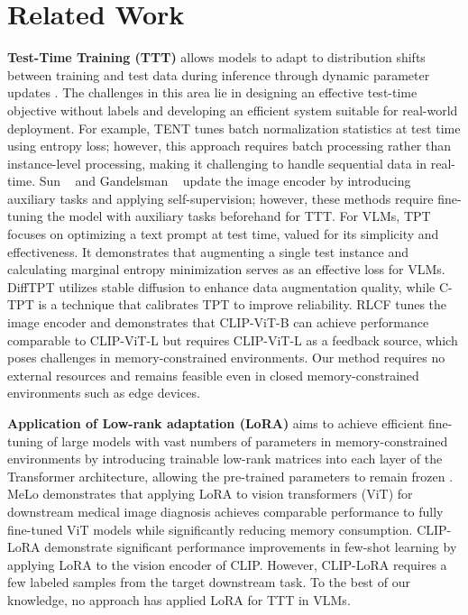 \section{Related Work}
\label{sec:related_works}

\noindent\textbf{Test-Time Training (TTT)} allows models to adapt to distribution shifts between training and test data during inference through dynamic parameter updates \citep{liang2024comprehensive,wang2024search,chen2022contrastive}.
The challenges in this area lie in designing an effective test-time objective without labels and developing an efficient system suitable for real-world deployment.
For example, TENT \citep{wang2020tent} tunes batch normalization statistics at test time using entropy loss; however, this approach requires batch processing rather than instance-level processing, making it challenging to handle sequential data in real-time.
Sun \etal~\cite{sun2020test} and Gandelsman \etal~\cite{gandelsman2022test} update the image encoder by introducing auxiliary tasks and applying self-supervision; however, these methods require fine-tuning the model with auxiliary tasks beforehand for TTT.
For VLMs, TPT \citep{shu2022test} focuses on optimizing a text prompt at test time, valued for its simplicity and effectiveness.
It demonstrates that augmenting a single test instance and calculating marginal entropy minimization \citep{zhang2022memo} serves as an effective loss for VLMs.
DiffTPT \citep{feng2023diverse} utilizes stable diffusion to enhance data augmentation quality, while C-TPT \citep{yoon2024c} is a technique that calibrates TPT to improve reliability.
RLCF \citep{zhao2023test} tunes the image encoder and demonstrates that CLIP-ViT-B can achieve performance comparable to CLIP-ViT-L but requires CLIP-ViT-L as a feedback source, which poses challenges in memory-constrained environments.
Our method requires no external resources and remains feasible even in closed memory-constrained environments such as edge devices.
\newline

\noindent\textbf{Application of Low-rank adaptation (LoRA)} aims to achieve efficient fine-tuning of large models with vast numbers of parameters in memory-constrained environments by introducing trainable low-rank matrices into each layer of the Transformer architecture, allowing the pre-trained parameters to remain frozen \citep{hu2021lora,han2024parameter,xin2024parameter}.
MeLo \citep{zhu2024melo} demonstrates that applying LoRA to vision transformers  (ViT) for downstream medical image diagnosis achieves comparable performance to fully fine-tuned ViT models while significantly reducing memory consumption.
CLIP-LoRA \citep{zanella2024low} demonstrate significant performance improvements in few-shot learning by applying LoRA to the vision encoder of CLIP.
However, CLIP-LoRA requires a few labeled samples from the target downstream task.
To the best of our knowledge, no approach has applied LoRA for TTT in VLMs. 
